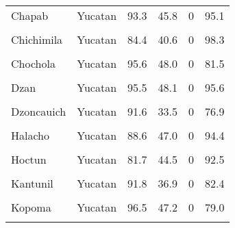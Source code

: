 \documentclass[
]{report}
\begin{document}
\begin{longtable}[t]{llrrrr}
Chapab & Yucatan & 93.3 & 45.8 & 0 & 95.1\\
\addlinespace
\cellcolor{gray!6}{Chemax} & \cellcolor{gray!6}{Yucatan} & \cellcolor{gray!6}{78.3} & \cellcolor{gray!6}{41.1} & \cellcolor{gray!6}{0} & \cellcolor{gray!6}{98.7}\\
Chichimila & Yucatan & 84.4 & 40.6 & 0 & 98.3\\
\cellcolor{gray!6}{Chikindzonot} & \cellcolor{gray!6}{Yucatan} & \cellcolor{gray!6}{85.4} & \cellcolor{gray!6}{41.5} & \cellcolor{gray!6}{0} & \cellcolor{gray!6}{98.7}\\
Chochola & Yucatan & 95.6 & 48.0 & 0 & 81.5\\
\cellcolor{gray!6}{Chumayel} & \cellcolor{gray!6}{Yucatan} & \cellcolor{gray!6}{88.7} & \cellcolor{gray!6}{59.9} & \cellcolor{gray!6}{0} & \cellcolor{gray!6}{97.2}\\
\addlinespace
Dzan & Yucatan & 95.5 & 48.1 & 0 & 95.6\\
\cellcolor{gray!6}{Dzemul} & \cellcolor{gray!6}{Yucatan} & \cellcolor{gray!6}{93.4} & \cellcolor{gray!6}{49.6} & \cellcolor{gray!6}{0} & \cellcolor{gray!6}{81.9}\\
Dzoncauich & Yucatan & 91.6 & 33.5 & 0 & 76.9\\
\cellcolor{gray!6}{Espita} & \cellcolor{gray!6}{Yucatan} & \cellcolor{gray!6}{87.8} & \cellcolor{gray!6}{41.9} & \cellcolor{gray!6}{0} & \cellcolor{gray!6}{93.8}\\
Halacho & Yucatan & 88.6 & 47.0 & 0 & 94.4\\
\addlinespace
\cellcolor{gray!6}{Hocaba} & \cellcolor{gray!6}{Yucatan} & \cellcolor{gray!6}{88.6} & \cellcolor{gray!6}{47.6} & \cellcolor{gray!6}{0} & \cellcolor{gray!6}{82.8}\\
Hoctun & Yucatan & 81.7 & 44.5 & 0 & 92.5\\
\cellcolor{gray!6}{Huhi} & \cellcolor{gray!6}{Yucatan} & \cellcolor{gray!6}{92.8} & \cellcolor{gray!6}{48.0} & \cellcolor{gray!6}{0} & \cellcolor{gray!6}{86.2}\\
Kantunil & Yucatan & 91.8 & 36.9 & 0 & 82.4\\
\cellcolor{gray!6}{Kaua} & \cellcolor{gray!6}{Yucatan} & \cellcolor{gray!6}{87.8} & \cellcolor{gray!6}{44.1} & \cellcolor{gray!6}{0} & \cellcolor{gray!6}{95.9}\\
\addlinespace
Kopoma & Yucatan & 96.5 & 47.2 & 0 & 79.0\\
\cellcolor{gray!6}{Mama} & \cellcolor{gray!6}{Yucatan} & \cellcolor{gray!6}{89.3} & \cellcolor{gray!6}{49.2} & \cellcolor{gray!6}{0} & \cellcolor{gray!6}{93.0}\\

\end{longtable}
\end{document}
